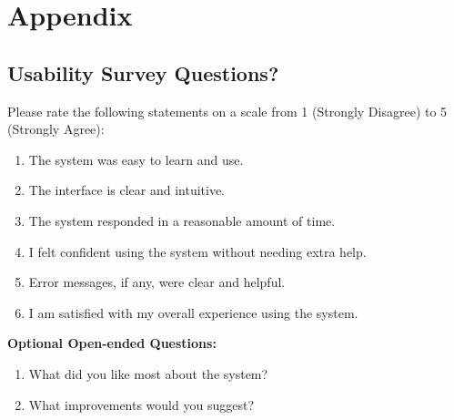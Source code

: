 \documentclass[12pt, titlepage]{article}
\begin{document}
				



%

\newpage

\section{Appendix}

\subsection{Usability Survey Questions?}
\label{sub:survey}
Please rate the following statements on a scale from 1 (Strongly Disagree) to 5 (Strongly Agree):

\begin{enumerate}
    \item The system was easy to learn and use.
    \item The interface is clear and intuitive.
    \item The system responded in a reasonable amount of time.
    \item I felt confident using the system without needing extra help.
    \item Error messages, if any, were clear and helpful.
    \item I am satisfied with my overall experience using the system.
\end{enumerate}

\vspace{1em}

\noindent \textbf{Optional Open-ended Questions:}
\begin{enumerate}
    \item What did you like most about the system?
    \item What improvements would you suggest?
\end{enumerate}
\end{document}

